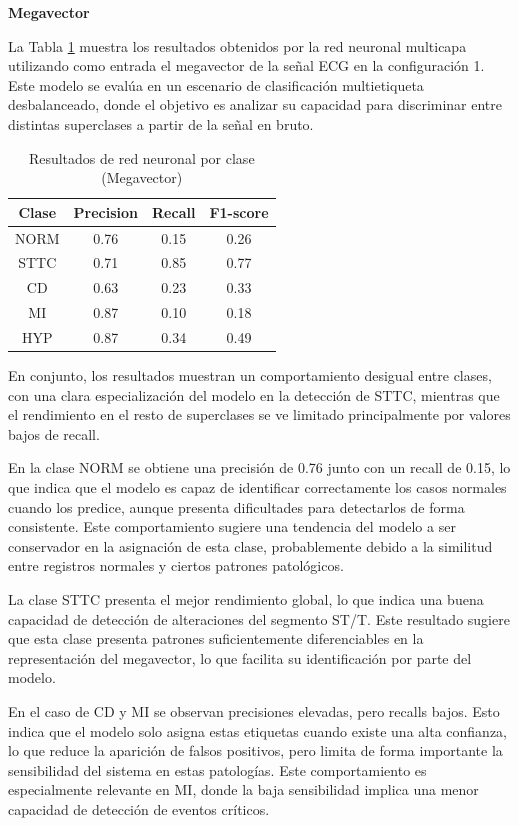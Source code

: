 \documentclass[12pt,a4paper,twoside]{book}
\begin{document}
\vspace{0.5cm}

\textbf{Megavector}

La Tabla \ref{tab:metrics_clase_mlp_mv} muestra los resultados obtenidos por la red neuronal multicapa utilizando como entrada el megavector de la señal ECG en la configuración 1. 
Este modelo se evalúa en un escenario de clasificación multietiqueta desbalanceado, donde el objetivo es analizar su capacidad para discriminar entre distintas superclases a partir de la señal en bruto.

\begin{table}[H]
	\centering
	\begin{tabular}{|c|c|c|c|}
	\hline
	\textbf{Clase} & \textbf{Precision} & \textbf{Recall} & \textbf{F1-score} \\
	\hline
	NORM & 0.76 & 0.15 & 0.26 \\
	STTC & 0.71 & 0.85 & 0.77 \\
	CD   & 0.63 & 0.23 & 0.33 \\
	MI   & 0.87 & 0.10 & 0.18 \\
	HYP  & 0.87 & 0.34 & 0.49 \\
	\hline
	\end{tabular}
	\caption{Resultados de red neuronal por clase (Megavector)}
	\label{tab:metrics_clase_mlp_mv}
\end{table}

En conjunto, los resultados muestran un comportamiento desigual entre clases, con una clara especialización del modelo en la detección de STTC, mientras que el rendimiento en el resto de superclases se ve limitado principalmente por valores bajos de recall.

En la clase NORM se obtiene una precisión de 0.76 junto con un recall de 0.15, lo que indica que el modelo es capaz de identificar correctamente los casos normales cuando los predice, aunque presenta dificultades para detectarlos de forma consistente. 
Este comportamiento sugiere una tendencia del modelo a ser conservador en la asignación de esta clase, probablemente debido a la similitud entre registros normales y ciertos patrones patológicos.

La clase STTC presenta el mejor rendimiento global, lo que indica una buena capacidad de detección de alteraciones del segmento ST/T. 
Este resultado sugiere que esta clase presenta patrones suficientemente diferenciables en la representación del megavector, lo que facilita su identificación por parte del modelo.

En el caso de CD y MI se observan precisiones elevadas, pero recalls bajos. 
Esto indica que el modelo solo asigna estas etiquetas cuando existe una alta confianza, lo que reduce la aparición de falsos positivos, pero limita de forma importante la sensibilidad del sistema en estas patologías. 
Este comportamiento es especialmente relevante en MI, donde la baja sensibilidad implica una menor capacidad de detección de eventos críticos.
\end{document}
